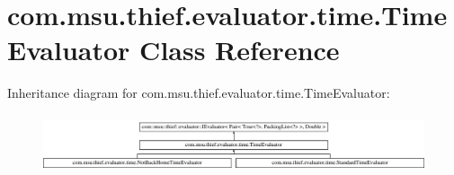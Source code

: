 \hypertarget{classcom_1_1msu_1_1thief_1_1evaluator_1_1time_1_1TimeEvaluator}{\section{com.\-msu.\-thief.\-evaluator.\-time.\-Time\-Evaluator Class Reference}
\label{classcom_1_1msu_1_1thief_1_1evaluator_1_1time_1_1TimeEvaluator}
}
Inheritance diagram for com.\-msu.\-thief.\-evaluator.\-time.\-Time\-Evaluator\-:\begin{figure}[H]
\begin{center}
\leavevmode
\includegraphics[height=1.735537cm]{classcom_1_1msu_1_1thief_1_1evaluator_1_1time_1_1TimeEvaluator}
\end{center}
\end{figure}
